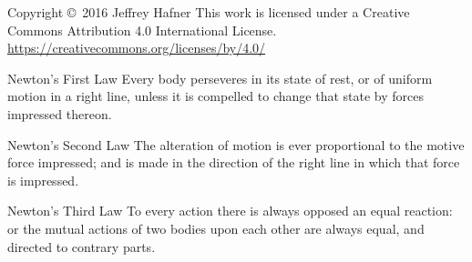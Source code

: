 \documentclass[avery5371,grid]{flashcards}
\begin{document}


\begin{flashcard}{Copyright \copyright \, 2016 Jeffrey Hafner}
\vspace{\fill}
This work is licensed under a Creative Commons Attribution 4.0 International License.
\vspace{\fill}
\flushright
\small\url{https://creativecommons.org/licenses/by/4.0/}
\end{flashcard}


\begin{flashcard}[Definition]{Newton's First Law}
\vspace{\fill}
Every body perseveres in its state of rest, or of uniform motion in a right line, unless it is compelled to change that state by forces impressed thereon.\cite{NaturalPhilosophy}
\vspace{\fill}
\end{flashcard}

\begin{flashcard}[Definition]{Newton's Second Law}
\vspace{\fill}
The alteration of motion is ever proportional to the motive force impressed; and is made in the direction of the right line in which that force is impressed.\cite{NaturalPhilosophy}
\vspace{\fill}
\end{flashcard}


\begin{flashcard}[Definition]{Newton's Third Law}
\vspace{\fill}
To every action there is always opposed an equal reaction: or the mutual actions of two bodies upon each other are always equal, and directed to contrary parts.\cite{NaturalPhilosophy}
\vspace{\fill}
\end{flashcard}
\end{document}

